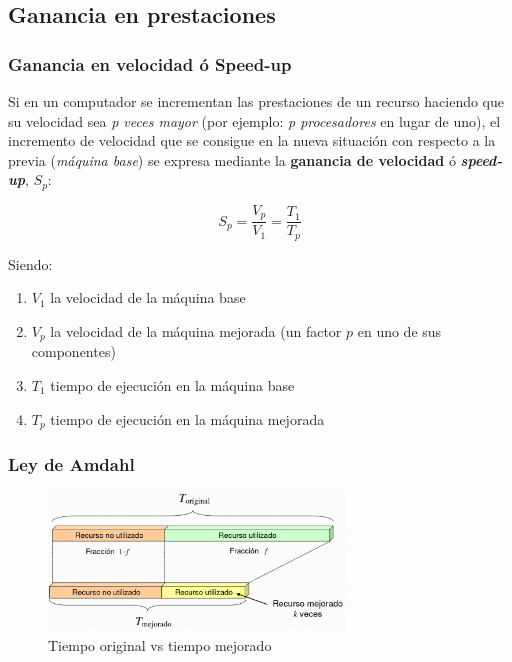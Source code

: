 \documentclass[10pt,a4paper,spanish]{report}
\begin{document}
\textcolor[rgb]{0.2,0.4,0.8}{\subsection{Ganancia en prestaciones}}
\textcolor[rgb]{0.2,0.4,0.8}{\subsubsection{Ganancia en velocidad ó Speed-up}}
Si en un computador se incrementan las prestaciones de un recurso haciendo que su velocidad sea \textit{\textcolor[rgb]{0.2,0.4,0.8}{p veces mayor}} (por ejemplo: \textit{\textcolor[rgb]{0.2,0.4,0.8}{p procesadores}} en lugar de uno), el incremento de velocidad que se consigue en la nueva situación con respecto a la previa (\textit{\textcolor[rgb]{0.2,0.4,0.8}{máquina base}}) se expresa mediante la \textbf{\textcolor[rgb]{0.2,0.4,0.8}{ganancia de velocidad}} ó \textbf{\textcolor[rgb]{0.2,0.4,0.8}{\textit{speed-up}}}, $S_p$:

\begin{displaymath}
S_p = \frac{V_p}{V_1} = \frac{T_1}{T_p}
\end{displaymath}

Siendo:
\begin{enumerate}[\color{azul}{\bf $\heartsuit$}]
  \item $V_1$ la velocidad de la máquina base
  \item $V_p$ la velocidad de la máquina mejorada (un factor $p$ en uno de sus componentes)
  \item $T_1$ tiempo de ejecución en la máquina base
  \item $T_p$ tiempo de ejecución en la máquina mejorada
\end{enumerate}

\textcolor[rgb]{0.2,0.4,0.8}{\subsubsection{Ley de Amdahl}}

\begin{figure}[!h]
    \centering
    \includegraphics[width=0.7\textwidth]{113}
    \caption{Tiempo original vs tiempo mejorado}
    \label{tiempos}
\end{figure}
\end{document}
